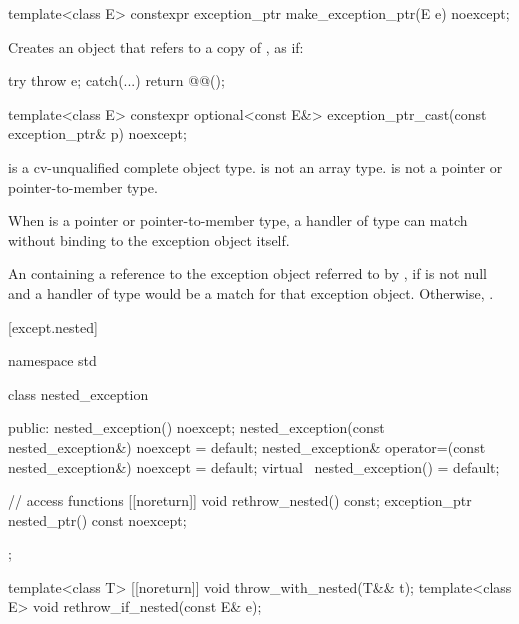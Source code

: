 %
\begin{itemdecl}
template<class E> constexpr exception_ptr make_exception_ptr(E e) noexcept;
\end{itemdecl}

\begin{itemdescr}
\pnum
\effects
Creates an  object that refers to a copy of , as if:
\begin{codeblock}
try {
  throw e;
} catch(...) {
  return @@();
}
\end{codeblock}
\end{itemdescr}

%
\begin{itemdecl}
template<class E>
  constexpr optional<const E&> exception_ptr_cast(const exception_ptr& p) noexcept;
\end{itemdecl}

\begin{itemdescr}
\pnum
\mandates
{} is a cv-unqualified complete object type.
 is not an array type.
 is not a pointer or pointer-to-member type.
\begin{note}
When  is a pointer or pointer-to-member type,
a handler of type  can match
without binding to the exception object itself.
\end{note}

\pnum
\returns
An  containing a reference
to the exception object referred to by ,
if  is not null and
a handler of type 
would be a match for that exception object.
Otherwise, .
\end{itemdescr}

[except.nested]{}

%
\begin{codeblock}
namespace std {
  class nested_exception {
  public:
    nested_exception() noexcept;
    nested_exception(const nested_exception&) noexcept = default;
    nested_exception& operator=(const nested_exception&) noexcept = default;
    virtual ~nested_exception() = default;

    // access functions
    [[noreturn]] void rethrow_nested() const;
    exception_ptr nested_ptr() const noexcept;
  };

  template<class T> [[noreturn]] void throw_with_nested(T&& t);
  template<class E> void rethrow_if_nested(const E& e);
}
\end{codeblock}

